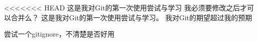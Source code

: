 \documentclass[UTF8]{ctexart}
\title{}
\author{冯上伦\\PB16001754}
\begin{document}
\maketitle
\section{}
<<<<<<< HEAD
 这是我对Git的第一次使用尝试与学习
 我必须要修改之后才可以合并么？
 这是我对Git的第一次使用尝试与学习。
 我对Git的期望超过我的预期

尝试一个gitignore，不清楚是否好用

\section{}

\section{}
\end{document}
